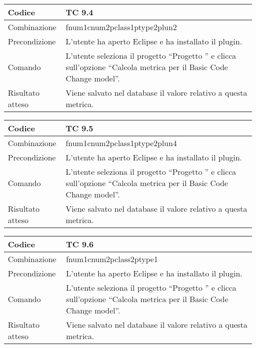 \begin{table}[ht]
\begin{tabular}{|p{3cm}|p{9cm}|}
\hline
\cellcolor{lightgray}Codice				& TC 9.4								\\
\hline
\cellcolor{lightgray}Combinazione		& fnum1cnum2pclass1ptype2plun2									\\
\hline
\cellcolor{lightgray}Precondizione		& L'utente ha aperto Eclipse e ha installato il plugin.		\\
\hline
\cellcolor{lightgray}Comando			& L'utente seleziona il progetto ``Progetto ''  e clicca sull'opzione ``Calcola metrica per il Basic Code Change model''.	\\
\hline
\cellcolor{lightgray}Risultato atteso	& Viene salvato nel database il valore relativo a questa metrica.\\
\hline
\end{tabular}
\end{table}


\begin{table}[ht]
\begin{tabular}{|p{3cm}|p{9cm}|}
\hline
\cellcolor{lightgray}Codice				& TC 9.5								\\
\hline
\cellcolor{lightgray}Combinazione		& fnum1cnum2pclass1ptype2plun4									\\
\hline
\cellcolor{lightgray}Precondizione		& L'utente ha aperto Eclipse e ha installato il plugin.		\\
\hline
\cellcolor{lightgray}Comando			& L'utente seleziona il progetto ``Progetto ''  e clicca sull'opzione ``Calcola metrica per il Basic Code Change model''.	\\
\hline
\cellcolor{lightgray}Risultato atteso	& Viene salvato nel database il valore relativo a questa metrica.\\
\hline
\end{tabular}
\end{table}


\begin{table}[ht]
\begin{tabular}{|p{3cm}|p{9cm}|}
\hline
\cellcolor{lightgray}Codice				& TC 9.6								\\
\hline
\cellcolor{lightgray}Combinazione		& fnum1cnum2pclass2ptype1									\\
\hline
\cellcolor{lightgray}Precondizione		& L'utente ha aperto Eclipse e ha installato il plugin.		\\
\hline
\cellcolor{lightgray}Comando			& L'utente seleziona il progetto ``Progetto ''  e clicca sull'opzione ``Calcola metrica per il Basic Code Change model''.	\\
\hline
\cellcolor{lightgray}Risultato atteso	& Viene salvato nel database il valore relativo a questa metrica.\\
\hline
\end{tabular}
\end{table}

